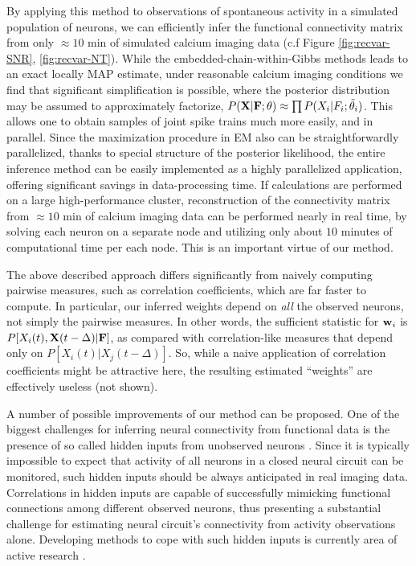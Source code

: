 By applying this method to observations of spontaneous activity in a simulated population of neurons, we can efficiently infer the functional connectivity matrix from only $\approx 10$ min of simulated calcium imaging data (c.f Figure \ref{fig:recvar-SNR}, \ref{fig:recvar-NT}). While the embedded-chain-within-Gibbs methods leads to an exact locally MAP estimate, under reasonable calcium imaging conditions we find that significant simplification is possible, where the posterior distribution may be assumed to approximately factorize, $P({\bf X}|{\bf F};\theta)\approx \prod P(X_i|F_i;\tilde\theta_i)$. This allows one to obtain samples of joint spike trains much more easily, and in parallel. Since the maximization procedure in EM also can be straightforwardly parallelized, thanks to special structure of the posterior likelihood, the entire inference method can be easily implemented as a highly parallelized application, offering significant savings in data-processing time. If calculations are performed on a large high-performance cluster, reconstruction of the connectivity matrix from $\approx 10$ min of calcium imaging data can be performed nearly in real time, by solving each neuron on a separate node and utilizing only about $10$ minutes of computational time per each node. This is an important virtue of our method.

The above described approach differs significantly from naively computing pairwise measures, such as correlation coefficients, which are far faster to compute.  In particular, our inferred weights depend on \emph{all} the observed neurons, not simply the pairwise measures.  In other words, the sufficient statistic for $\mathbf{w}_i$ is $P[X_i(t), {\bf X}(t-\Delta) | {\bf F}]$, as compared with correlation-like measures that depend only on $P[X_i(t) | X_j(t-\Delta)]$.  So, while a naive application of correlation coefficients might be attractive here, the resulting estimated ``weights'' are effectively useless (not shown).  

A number of possible improvements of our method can be proposed. One of the biggest challenges for inferring neural connectivity from functional data is the presence of so called hidden inputs from unobserved neurons \cite{Vidne08}. Since it is typically impossible to expect that activity of all neurons in a closed neural circuit can be monitored, such hidden inputs should be always anticipated in real imaging data. Correlations in hidden inputs are capable of successfully mimicking functional connections among different observed neurons, thus presenting a substantial challenge for estimating neural circuit's connectivity from activity observations alone. Developing methods to cope with such hidden inputs is currently area of active research \cite{Vidne08}.  %

